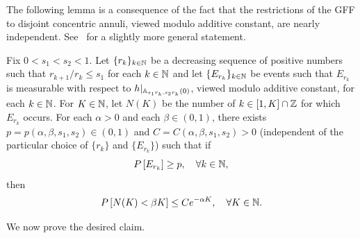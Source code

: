 \documentclass[12pt]{amsart}
\numberwithin{equation}{section}
\begin{document}
	
	The following lemma is a consequence of the fact that the restrictions of the GFF to disjoint concentric annuli, viewed modulo additive constant, are nearly independent. See~\cite[Lemma 3.1]{gwynne2020local} for a slightly more general statement. 
	
	
	\begin{lemma} \label{lemma:annulus-iterate}
		Fix $0 < s_1<s_2 < 1$. Let $\{r_k\}_{k\in\mathbb{N}}$ be a decreasing sequence of positive numbers such that $r_{k+1} / r_k \leq s_1$ for each $k\in\mathbb{N}$ and let $\{E_{r_k} \}_{k\in\mathbb{N}}$ be events such that $E_{r_k}$ is measurable with respect to $h |_{\mathbb{A}_{s_1 r_k , s_2 r_k}(0)  } $, viewed modulo additive constant, for each $k\in\mathbb{N}$. 
		For $K\in\mathbb{N}$, let $N(K)$ be the number of $k\in [1,K] \cap \mathbb{Z}$ for which $E_{r_k}$ occurs. 
		For each $\alpha > 0$ and each $\beta \in (0,1)$, there exists $p = p(\alpha,\beta,s_1,s_2) \in (0,1)$ and $C = C(\alpha,\beta,s_1,s_2) > 0$ (independent of the particular choice of $\{r_k\}$ and $\{E_{r_k}\}$) such that if  
		\begin{equation} \label{eqn-annulus-iterate-prob}
		P\left[ E_{r_k}  \right] \geq p , \quad \forall k\in\mathbb{N}  ,
		\end{equation} 
		then 
		\begin{equation} \label{eqn-annulus-iterate}
		P\left[ N(K)  < \beta K\right] \leq C e^{-\alpha K} ,\quad\forall K \in \mathbb{N}. 
		\end{equation}  
	\end{lemma}
	
	We now prove the desired claim.
	
\end{document}
